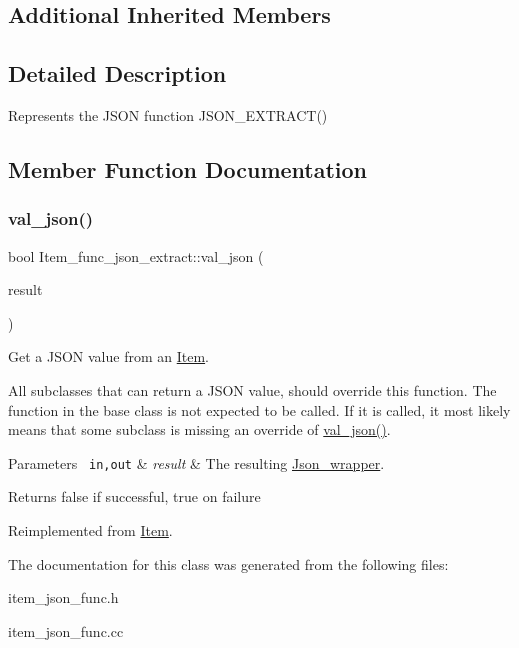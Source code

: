 \subsection*{Additional Inherited Members}


\subsection{Detailed Description}
Represents the J\+S\+ON function J\+S\+O\+N\+\_\+\+E\+X\+T\+R\+A\+C\+T() 

\subsection{Member Function Documentation}
\mbox{\label{classItem__func__json__extract_ab775e6ae9faf1c5df20596fea217f383}} 
\subsubsection{\texorpdfstring{val\+\_\+json()}{val\_json()}}
{\footnotesize\ttfamily bool Item\+\_\+func\+\_\+json\+\_\+extract\+::val\+\_\+json (\begin{DoxyParamCaption}\item[{\mbox{\hyperlink{classJson__wrapper}{Json\+\_\+wrapper}} $\ast$}]{result }\end{DoxyParamCaption})\hspace{0.3cm}{\ttfamily [virtual]}}

Get a J\+S\+ON value from an \mbox{\hyperlink{classItem}{Item}}.

All subclasses that can return a J\+S\+ON value, should override this function. The function in the base class is not expected to be called. If it is called, it most likely means that some subclass is missing an override of \mbox{\hyperlink{classItem__func__json__extract_ab775e6ae9faf1c5df20596fea217f383}{val\+\_\+json()}}.


\begin{DoxyParams}[1]{Parameters}
\mbox{\texttt{ in,out}}  & {\em result} & The resulting \mbox{\hyperlink{classJson__wrapper}{Json\+\_\+wrapper}}.\\
\hline
\end{DoxyParams}
\begin{DoxyReturn}{Returns}
false if successful, true on failure 
\end{DoxyReturn}


Reimplemented from \mbox{\hyperlink{classItem_a57e763fcde2d0a819d21e31c59611290}{Item}}.



The documentation for this class was generated from the following files\+:\begin{DoxyCompactItemize}
\item 
item\+\_\+json\+\_\+func.\+h\item 
item\+\_\+json\+\_\+func.\+cc\end{DoxyCompactItemize}
